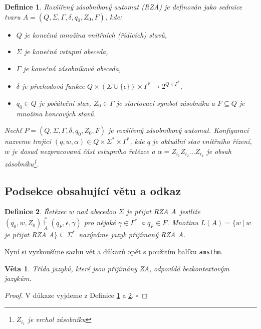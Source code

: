 \documentclass[a4paper, 11pt]{article}
\begin{document}
\newtheorem{definition}{Definice}
\begin{definition}\label{Definice1}
\emph{Rozšířený zásobníkový automat (RZA)} je de\-finován jako sedmice 
tvaru $A = (Q, \Sigma, \Gamma, \delta, q_0, Z_0, F)$, kde:
\begin{itemize}
  \item $Q$ je konečná množina \emph{vnitřních (řídicích) stavů,}
  \item $\Sigma$ je konečná \emph{vstupní abeceda,}
  \item $\Gamma$ je konečná \emph{zásobníková abeceda,}
  \item $\delta$ je \emph{přechodová funkce} $Q\times(\Sigma \cup\{\epsilon\}) \times \Gamma^*\rightarrow 2^{Q\times \Gamma^*}$,
   \item $q_0 \in Q$ je \emph{počáteční stav}, $Z_0 \in \Gamma$ je \emph{startovací symbol zásobníku} a $F \subseteq Q$ je množina  \emph{koncových stavů}.
\end{itemize}

    \emph{Nechť} $P = (Q, \Sigma, \Gamma, \delta, q_0, Z_0, F)$ \emph{je rozšířený zásobníkový automat.} Konfigurací \emph{nazveme trojici} $(q, w, \alpha)\in Q \times \Sigma^* \times \Gamma^*$\emph{, kde} $q$ \emph{je aktuální stav vnitřního řízení,} $w$ \emph{je dosud nezpracovaná část vstupního řetězce a} $\alpha = Z_{i_1} Z_{i_2}\dots Z_{i_k}$ \emph{je obsah zásobníku}\footnote[1]{$Z_{i_1}$ \emph{je vrchol zásobníku}}.
\end{definition}

\subsection{Podsekce obsahující větu a odkaz}

\begin{definition}\label{Definice2} 
\emph{Řetězec} $w$ \emph{nad abecedou} $\Sigma$ \emph{je přijat} \textup{RZA}
$A$~jestliže $(q_0, w, Z_0) \overset{*}{\underset{A}\vdash}(q_F, \epsilon, \gamma)$ pro nějaké $\gamma \in \Gamma^*$~a $q_F \in F$. Množinu $L(A) = \{w\  |\  w$ je přijat RZA A$\}\subseteq\Sigma^*$~nazýváme 
\emph{jazyk přijímaný} \textup{RZA} $A$.
\end{definition}   

    Nyní si vyzkoušíme sazbu vět a důkazů opět s použitím balíku \texttt{amsthm}.

\newtheorem{remark}{Věta}  
\begin{remark}\label{Věta1}
Třída jazyků, které jsou přijímány \textup{ZA}, odpovídá \emph{bezkontextovým jazykům.}
\end{remark}
\begin{proof}
V důkaze vyjdeme z Definice \ref{Definice1} a \ref{Definice2}. \hfill $\square$
\end{proof}
\end{document}
